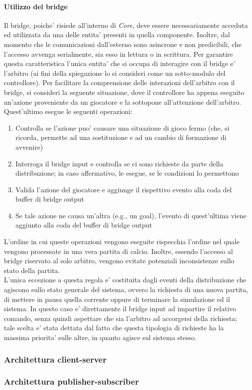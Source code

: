 \paragraph{Utilizzo del bridge}\label{sec:analisi_distribuzione_bridge_utilizzo} Il bridge, poiche' risiede all'interno di \textit{Core}, deve essere necessariamente acceduta ed utilizzata da una delle entita' presenti in quella componente. Inoltre, dal momento che le comunicazioni dall'esterno sono asincrone e non predicibili, che l'accesso avvenga serialmente, sia esso in lettura o in scrittura. Per garantire questa caratteristica l'unica entita' che si occupa di interagire con il bridge e' l'arbitro (ai fini della spiegazione lo si consideri come un sotto-modulo del controllore). Per facilitare la comprensione delle interazioni dell'arbitro con il bridge, si consideri la seguente situazione, dove il controllore ha appena eseguito un'azione proveniente da un giocatore e la sottopone all'attenzione dell'arbitro. Quest'ultimo esegue le seguenti operazioni:

\begin{enumerate}
	\item Controlla se l'azione puo' causare una situazione di gioco fermo (che, si ricorda, permette ad una sostituzione e ad un cambio di formazione di avvenire)
	\item Interroga il bridge input e controlla se ci sono richieste da parte della distribuzione; in caso affermativo, le esegue, se le condizioni lo permettono
	\item Valida l'azione del giocatore e aggiunge il rispettivo evento alla coda del buffer di bridge output
	\item Se tale azione ne causa un'altra (e.g., un goal), l'evento di quest'ultima viene aggiunto alla coda del buffer di bridge output
\end{enumerate}

L'ordine in cui queste operazioni vengono eseguite rispecchia l'ordine nel quale vengono processate in una vera partita di calcio. Inoltre, essendo l'accesso al bridge riservato al solo arbitro, vengono evitate potenziali inconsistenze sullo stato della partita.\\

L'unica eccezione a questa regola e' costituita dagli eventi della distribuzione che agiscono sullo stato generale del sistema, ovvero la richiesta di una nuova partita, di mettere in pausa quella corrente oppure di terminare la simulazione ed il sistema. In questo caso e' direttamente il bridge input ad impartire il relativo comando, senza quindi aspettare che sia l'arbitro ad accorgersi della richiesta; tale scelta e' stata dettata dal fatto che questa tipologia di richieste ha la massima priorita' sulle altre, in quanto agisce sul sistema stesso.

\subsubsection{Architettura client-server}
\label{sec:analisi_client_server}

\subsubsection{Architettura publisher-subscriber}
\label{sec:analisi_client_pusblisher_subscriber}